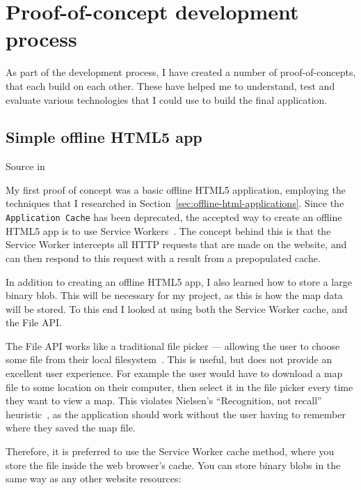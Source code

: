 \documentclass[hyphens]{final_report}
\begin{document}
\clearpage
\chapter{Proof-of-concept development process}

As part of the development process, I have created a number of proof-of-concepts, that each build on each other. These have helped me to understand, test and evaluate various technologies that I could use to build the final application.

\section{Simple offline HTML5 app}

{ \hfill \footnotesize Source in }

My first proof of concept was a basic offline HTML5 application, employing the techniques that I researched in Section~\ref{sec:offline-html-applications}. Since the \texttt{Application Cache} has been deprecated, the accepted way to create an offline HTML5 app is to use Service Workers~\cite{w3c-service-workers-caches}. The concept behind this is that the Service Worker intercepts all HTTP requests that are made on the website, and can then respond to this request with a result from a prepopulated cache.

In addition to creating an offline HTML5 app, I also learned how to store a large binary blob. This will be necessary for my project, as this is how the map data will be stored. To this end I looked at using both the Service Worker cache, and the File API\@.

The File API works like a traditional file picker --- allowing the user to choose some file from their local filesystem~\cite{w3c-file-api}. This is useful, but does not provide an excellent user experience. For example the user would have to download a map file to some location on their computer, then select it in the file picker every time they want to view a map. This violates Nielsen's ``Recognition, not recall'' heuristic~\cite{nielsen-heuristics}, as the application should work without the user having to remember where they saved the map file.

Therefore, it is preferred to use the Service Worker cache method, where you store the file inside the web browser's cache. You can store binary blobs in the same way as any other website resources:
\end{document}
